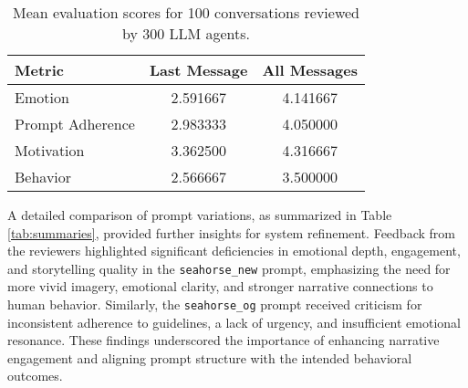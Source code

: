 \documentclass[sigconf, nonacm]{acmart}
\begin{document}
\begin{table}[ht]
    \centering
    \begin{tabular}{lcc}
        \toprule
        \textbf{Metric}            & \textbf{Last Message} & \textbf{All Messages} \\
        \midrule
        Emotion                    & 2.591667              & 4.141667              \\
        Prompt Adherence           & 2.983333              & 4.050000              \\
        Motivation                 & 3.362500              & 4.316667              \\
        Behavior                   & 2.566667              & 3.500000              \\
        \bottomrule
    \end{tabular}
    \caption{Mean evaluation scores for 100 conversations reviewed by 300 LLM agents.}
    \label{tab:means}
\end{table}

A detailed comparison of prompt variations, as summarized in Table \ref{tab:summaries}, provided further insights for system refinement. Feedback from the reviewers highlighted significant deficiencies in emotional depth, engagement, and storytelling quality in the \texttt{seahorse\_new} prompt, emphasizing the need for more vivid imagery, emotional clarity, and stronger narrative connections to human behavior. Similarly, the \texttt{seahorse\_og} prompt received criticism for inconsistent adherence to guidelines, a lack of urgency, and insufficient emotional resonance. These findings underscored the importance of enhancing narrative engagement and aligning prompt structure with the intended behavioral outcomes.
\end{document}
